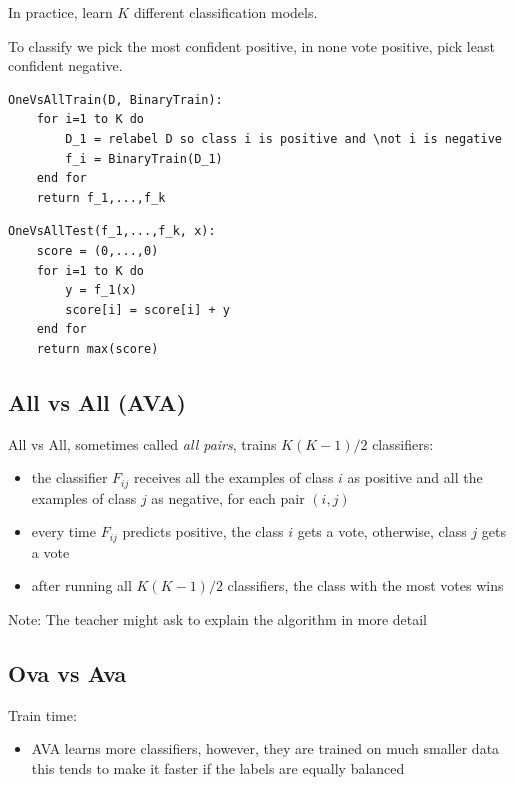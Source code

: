 \documentclass{article}
\begin{document}
In practice, learn \(K\) different classification models.

To classify we pick the most confident positive, in none vote positive,
pick least confident negative.

\begin{verbatim}
OneVsAllTrain(D, BinaryTrain):
    for i=1 to K do
        D_1 = relabel D so class i is positive and \not i is negative
        f_i = BinaryTrain(D_1)
    end for
    return f_1,...,f_k 
\end{verbatim}

\begin{verbatim}
OneVsAllTest(f_1,...,f_k, x):
    score = (0,...,0)
    for i=1 to K do
        y = f_1(x)
        score[i] = score[i] + y
    end for
    return max(score)
\end{verbatim}

\subsection{All vs All (AVA)}\label{all-vs-all-ava}

All vs All, sometimes called \emph{all pairs}, trains \(K(K-1)/2\)
classifiers:

\begin{itemize}
\tightlist
\item
  the classifier \(F_{ij}\) receives all the examples of class \(i\) as
  positive and all the examples of class \(j\) as negative, for each
  pair \((i, j)\)
\item
  every time \(F_{ij}\) predicts positive, the class \(i\) gets a vote,
  otherwise, class \(j\) gets a vote
\item
  after running all \(K(K-1)/2\) classifiers, the class with the most
  votes wins
\end{itemize}

Note: The teacher might ask to explain the algorithm in more detail

\subsection{Ova vs Ava}\label{ova-vs-ava}

Train time:

\begin{itemize}
\tightlist
\item
  AVA learns more classifiers, however, they are trained on much smaller
  data this tends to make it faster if the labels are equally balanced
\end{itemize}
\end{document}
